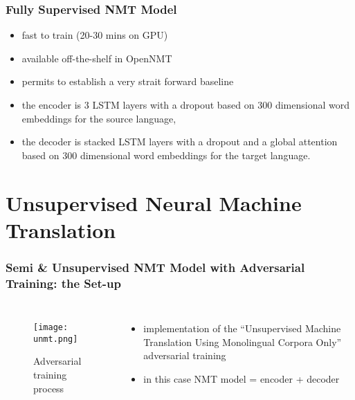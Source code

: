 \documentclass{beamer}
\begin{document}
\begin{frame}
\frametitle{Fully Supervised NMT Model}

\begin{itemize}
\item fast to train (20-30 mins on GPU)
\item available off-the-shelf in OpenNMT
\item permits to establish a very strait forward baseline
\item<2-3> the encoder is $3$ LSTM layers with a dropout based on $300$ dimensional word embeddings for the source language,
\item<2-3> the decoder is stacked LSTM layers with a dropout and a global attention based on $300$ dimensional word embeddings for the target language.
\end{itemize}


\end{frame}

\section{Unsupervised Neural Machine Translation}

\begin{frame}
\frametitle{Semi \& Unsupervised NMT Model with Adversarial Training: the Set-up}

\begin{columns}
\centering
\begin{figure}
\texttt{[image: unmt.png]}
\caption{Adversarial training process}
\end{figure}
\begin{itemize}
\item implementation of the ``Unsupervised Machine Translation Using Monolingual Corpora Only'' adversarial training
\item in this case NMT model = encoder + decoder
\end{itemize}
\end{columns}

\end{frame}
\end{document}
